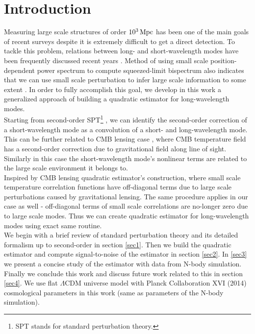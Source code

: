 \documentclass[prd,amsmath,amssymb,floatfix,superscriptaddress,nofootinbib,twocolumn]{revtex4-1}
\begin{document}
\section{Introduction}
Measuring large scale structures of order $10^3\, \rm Mpc$ has been one of the main goals of recent surveys despite it is extremely difficult to get a direct detection. To tackle this problem, relations between long- and short-wavelength modes have been frequently discussed recent years \cite{Baldauf:2011fer}\cite{Barreira:2017res}. Method of using small scale position-dependent power spectrum to compute squeezed-limit bispectrum also indicates that we can use small scale perturbation to infer large scale information to some extent \cite{Chiang:2014pos}\cite{Chiang:2015poss}. In order to fully accomplish this goal, we develop in this work a generalized approach of building a quadratic estimator for long-wavelength modes. \\
Starting from second-order SPT\footnote{SPT stands for standard perturbation theory.} \cite{Goroff:1986sts}\cite{Makino:1992fs}\cite{Jain:1994sop}, we can identify the second-order correction of a short-wavelength mode as a convolution of a short- and long-wavelength mode. This can be further related to CMB lensing case \cite{Hu:2002mr}, where CMB temperature field has a second-order correction due to gravitational field along line of sight. Similarly in this case the short-wavelength mode's nonlinear terms are related to the large scale environment it belongs to.
\\
Inspired by CMB lensing quadratic estimator's construction, where small scale temperature correlation functions have off-diagonal terms due to
large scale perturbations caused by gravitational lensing. The same procedure applies in our case as well - off-diagonal terms of small scale correlations are no-longer zero due to large scale modes. Thus we can create quadratic estimator for long-wavelength modes using exact same routine. \\
We begin with a brief review of standard perturbation theory and its detailed formalism up to second-order in section \ref{sec1}. Then we build the quadratic estimator and compute signal-to-noise of the estimator in section \ref{sec2}. In \ref{sec3} we present a concise study of the estimator with data from N-body simulation. Finally we conclude this work and discuss future work related to this in section \ref{sec4}. We use flat $\Lambda$CDM universe model with Planck Collaboration XVI (2014) \cite{Planck:2014cos} cosmological parameters in this work (same as parameters of the N-body simulation).
\end{document}

